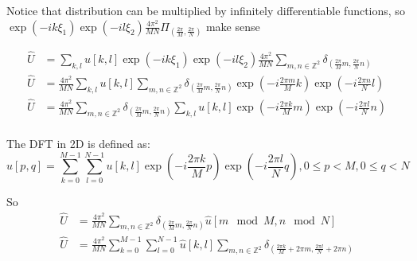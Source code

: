 \documentclass{article}
\begin{document}
	Notice that distribution can be multiplied by infinitely differentiable functions, so $\exp(-ik\xi_1) \exp(-il\xi_2) \frac{4\pi^2}{MN} \Pi_{(\frac{2\pi}{M},\frac{2\pi}{N})}$ make sense
	
	\begin{equation}
	\begin{split}
	\hat{U} &= \sum_{k,l} u[k,l]  \exp(-ik\xi_1) \exp(-il\xi_2) \frac{4\pi^2}{MN} \sum_{m,n\in \mathbb{Z}^2} \delta_{(\frac{2\pi}{M}m,\frac{2\pi}{N}n)}\\
	\hat{U} &=  \frac{4\pi^2}{MN} \sum_{k,l} u[k,l]  \sum_{m,n\in \mathbb{Z}^2} \delta_{(\frac{2\pi}{M}m,\frac{2\pi}{N}n)} \exp(-i\frac{2\pi m}{M}k) \exp(-i\frac{2\pi n}{N}l)\\
	\hat{U} &=  \frac{4\pi^2}{MN}  \sum_{m,n\in \mathbb{Z}^2}    \delta_{(\frac{2\pi}{M}m,\frac{2\pi}{N}n)} \sum_{k,l} u[k,l] \exp(-i\frac{2\pi k}{M}m) \exp(-i\frac{2\pi l}{N}n)\\
	\end{split}
	\end{equation}
	
	The DFT in 2D is defined as:
	\begin{equation}
	\hat{u}[p,q] = \sum_{k=0}^{M-1} \sum_{l=0}^{N-1} u[k,l] \exp(-i\frac{2\pi k}{M} p) \exp(-i\frac{2\pi l}{N} q), 0\leq p <M, 0 \leq q < N
	\end{equation}
	
	So
	\begin{equation}
	\begin{split}
	\hat{U} &=  \frac{4\pi^2}{MN}  \sum_{m,n\in \mathbb{Z}^2}    \delta_{(\frac{2\pi}{M}m,\frac{2\pi}{N}n)} \hat{u}[m\mod M,n \mod N]\\
	\hat{U} &=  \frac{4\pi^2}{MN}  \sum_{k=0}^{M-1} \sum_{l=0}^{N-1} \hat{u}[k,l] \sum_{m,n\in \mathbb{Z}^2} \delta_{(\frac{2\pi k}{M}+2\pi m,\frac{2\pi l}{N}+2 \pi n)}\\
	\end{split}
	\end{equation}
\end{document}
